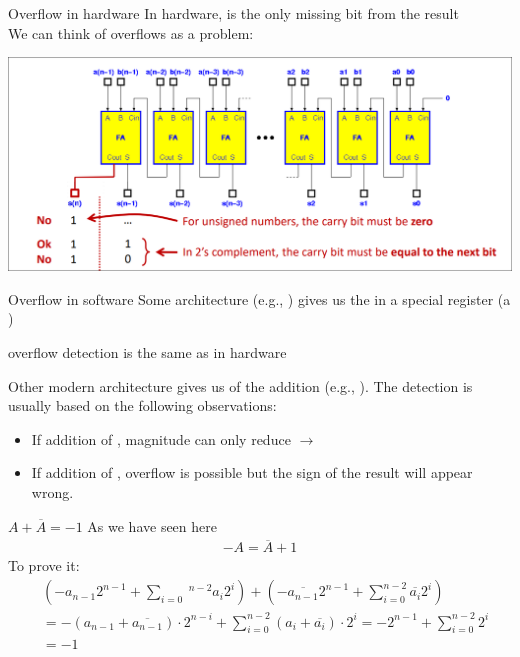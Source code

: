 \begin{parag}{Overflow in hardware}
    In hardware,  is the only missing bit from the  result\\
	We can think of overflows as a  problem:
	\begin{center}
	\includegraphics[scale=0.3]{screenshots/2025-10-21_2.png}
	\end{center}
\end{parag}
\begin{parag}{Overflow in software}
    Some architecture (e.g., ) gives us the  in a special register (a )
	\begin{center}
	    \textrightarrow overflow detection is the same as in hardware
	\end{center}
	Other modern architecture gives us  of the addition (e.g., ). The detection is usually based on the following observations:
	\begin{itemize}
	    \item If addition of , magnitude can only reduce $\to$
	    \item If addition of , overflow is possible but the sign of the result will appear wrong.
	\end{itemize}
	
	
	\end{parag}
\begin{parag}{$A + \overline{A} = -1$}
	As we have seen here
	\begin{align*} -A = \overline{A} + 1\end{align*}
	To prove it:
	\begin{align*} &\left(-a_{n-1} 2^{n-1} + \sum_{i =  0}\
		^{n-2}a_i2^i\right) + \left(-\overline{a_{n-1}}2^{n-1} + \sum_{i = 0}^{n-2}\overline{a_i}2^i\right) \\ &= - \left(a_{n-1} + \overline{a_{n-1}}\right) \cdot 2^{n-i} + \sum_{i = 0}^{n-2}\left(a_i + \overline{a_i}\right) \cdot 2^i =  -2^{n-1} + \sum_{i = 0}^{n-2}  2^i\\ &=  -1
\end{align*}
    
\end{parag}
